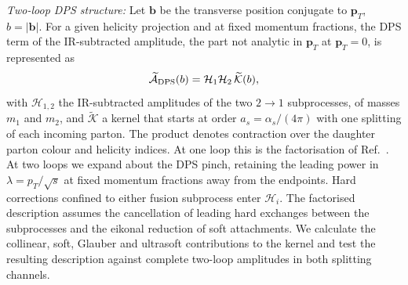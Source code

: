 \documentclass[%
 twocolumn,
 superscriptaddress,
 preprintnumbers,
 nofootinbib,
 amsmath,amssymb,
 aps,
 prl,
]{revtex4-2}
\newcommand{\bb}{\boldsymbol b}
\newcommand{\Kt}{\widetilde{\mathcal K}}
\begin{document}
\textit{Two-loop DPS structure:} Let $\bb$ be the transverse position conjugate to $\boldsymbol p_T$,
$b=|\bb|$. For a given helicity projection and at fixed momentum fractions, the DPS term of the
IR-subtracted amplitude, the part not analytic in $\boldsymbol p_T$ at $\boldsymbol p_T=0$,
is represented as
\begin{equation}
\widetilde{\mathcal A}_{\rm DPS}(b)=\mathcal H_1\mathcal H_2\,\Kt(b),
\label{eq:factorised}
\end{equation}
with $\mathcal H_{1,2}$ the IR-subtracted amplitudes of the two $2\to1$ subprocesses, of
masses $m_1$ and $m_2$, and $\Kt$ a kernel that starts at order $a_s=\alpha_s/(4\pi)$ with one
splitting of each incoming parton. The product denotes contraction over the daughter parton
colour and helicity indices. At one loop this is the factorisation of
Ref.~\cite{Gaunt:2011xd}. At two loops we expand about
the DPS pinch, retaining the leading power in
$\lambda=p_T/\sqrt{s}$ at fixed momentum fractions
away from the endpoints. Hard corrections confined
to either fusion subprocess enter $\mathcal H_i$.
The factorised description assumes the cancellation
of leading hard exchanges between the subprocesses
and the eikonal reduction of soft attachments.
We calculate the collinear, soft, Glauber and ultrasoft
contributions to the kernel and test the resulting
description against complete two-loop amplitudes
in both splitting channels.
\end{document}
